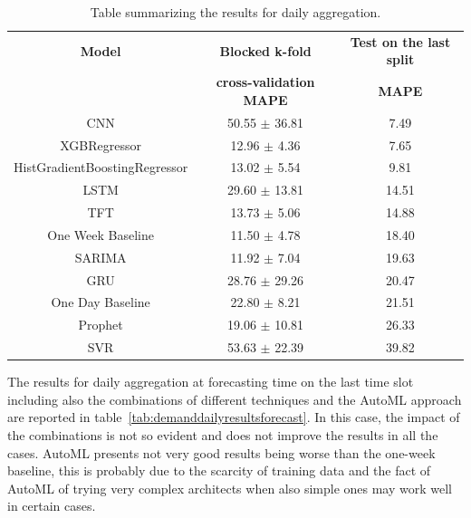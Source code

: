 \begin{table}[H]
\centering
\begin{tabular}{|c|c|c|}
\hline
\textbf{Model} & \textbf{Blocked k-fold} & \textbf{Test on the last split}\\
 & \textbf{cross-validation MAPE} & \textbf{MAPE}\\
\hline
CNN & 50.55 $\pm$ 36.81 & 7.49\\
\hline
XGBRegressor & 12.96 $\pm$ 4.36 & 7.65\\
\hline
HistGradientBoostingRegressor & 13.02 $\pm$ 5.54 & 9.81\\
\hline
LSTM & 29.60 $\pm$ 13.81 & 14.51\\
\hline
TFT & 13.73 $\pm$ 5.06 & 14.88\\
\hline
One Week Baseline & 11.50 $\pm$ 4.78 & 18.40\\
\hline
SARIMA & 11.92 $\pm$ 7.04 & 19.63\\
\hline
GRU & 28.76 $\pm$ 29.26 & 20.47\\
\hline
One Day Baseline & 22.80 $\pm$ 8.21 & 21.51\\
\hline
Prophet & 19.06 $\pm$ 10.81 & 26.33\\
\hline
SVR & 53.63 $\pm$ 22.39 & 39.82\\
\hline
\end{tabular}
\caption{Table summarizing the results for daily aggregation.}
\label{tab:demanddailyresults}
\end{table}

The results for daily aggregation at forecasting time on the last time slot including also the combinations of different techniques and the AutoML approach are reported in table~\ref{tab:demanddailyresultsforecast}.
In this case, the impact of the combinations is not so evident and does not improve the results in all the cases.
AutoML presents not very good results being worse than the one-week baseline, this is probably due to the scarcity of training data and the fact of AutoML of trying very complex architects when also simple ones may work well in certain cases.

